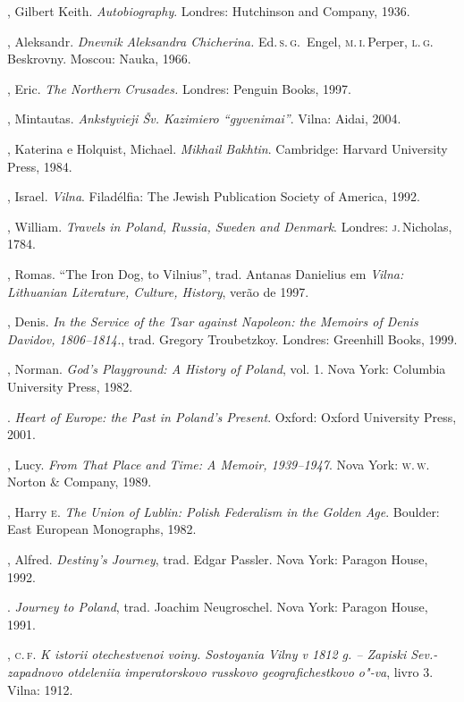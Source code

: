 \begin{bibliohedra}
  , Gilbert Keith. \textit{Autobiography}. Londres: Hutchinson
  and Company, 1936.

  , Aleksandr. \textit{Dnevnik Aleksandra Chicherina.} Ed.\,\textsc{s.\,g.}\,
  Engel, \textsc{m.\,i.}\,Perper, \textsc{l.\,g.}\,Beskrovny. Moscou: Nauka, 1966.

  , Eric. \textit{The Northern Crusades.} Londres: Penguin
  Books, 1997.

  , Mintautas. \textit{Ankstyvieji Šv. Kazimiero
  ``gyvenimai''}. Vilna: Aidai, 2004.

  , Katerina e Holquist, Michael. \textit{Mikhail Bakhtin}.
  Cambridge: Harvard University Press, 1984.

  , Israel. \textit{Vilna}. Filadélfia: The Jewish Publication
  Society of America, 1992.

  , William. \textit{Travels in Poland, Russia, Sweden and Denmark}.
  Londres: \textsc{j}.\,Nicholas, 1784.

  , Romas. ``The Iron Dog, to Vilnius'', trad. Antanas
  Danielius em \textit{Vilna: Lithuanian Literature, Culture, History},
  verão de 1997.

  , Denis. \textit{In the Service of the Tsar against Napoleon: the
  Memoirs of Denis Davidov, 1806--1814.}, trad. Gregory Troubetzkoy.
  Londres: Greenhill Books, 1999.

  , Norman. \textit{God's Playground: A History of Poland}, vol. 1.
  Nova York: Columbia University Press, 1982.

  \titidem. \textit{Heart of Europe: the Past in Poland's Present}.
  Oxford: Oxford University Press, 2001.

  , Lucy. \textit{From That Place and Time: A Memoir,
  1939--1947}. Nova York: \textsc{w.\,w.}\,Norton \& Company, 1989.

  , Harry \textsc{e}. \textit{The Union of Lublin: Polish Federalism in
  the Golden Age}. Boulder: East European Monographs, 1982.

  , Alfred. \textit{Destiny's Journey}, trad. Edgar Passler. Nova
  York: Paragon House, 1992.

  \titidem. \textit{Journey to Poland}, trad. Joachim Neugroschel.
  Nova York: Paragon House, 1991.

  , \textsc{c.\,f.} \textit{K istorii otechestvenoi voiny. Sostoyania
  Vilny v 1812 g. -- Zapiski Sev.-zapadnovo otdeleniia imperatorskovo
  russkovo geografichestkovo o"-va}, livro 3. Vilna: 1912.


\end{bibliohedra}
